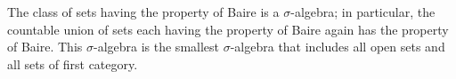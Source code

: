 The class of sets having the property of Baire is a $\sigma$-algebra; in particular, the countable union of sets each having the property of Baire again has the property of Baire. This $\sigma$-algebra is the smallest $\sigma$-algebra that includes all open sets and all sets of first category.
